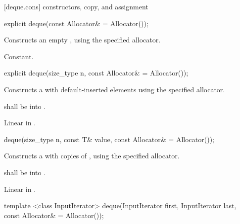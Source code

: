 [deque.cons]{ constructors, copy, and assignment}

%
%
\begin{itemdecl}
explicit deque(const Allocator& = Allocator());
\end{itemdecl}

\begin{itemdescr}
\pnum
\effects
Constructs an empty
,
using the specified allocator.

\pnum
\complexity
Constant.
\end{itemdescr}

%
%
\begin{itemdecl}
explicit deque(size_type n, const Allocator& = Allocator());
\end{itemdecl}

\begin{itemdescr}
\pnum
\effects Constructs a  with
 default-inserted elements using the specified allocator.

\pnum
\requires {} shall be  into .

\pnum
\complexity Linear in .
\end{itemdescr}

%
%
\begin{itemdecl}
deque(size_type n, const T& value,
      const Allocator& = Allocator());
\end{itemdecl}

\begin{itemdescr}
\pnum
\effects
Constructs a
with  copies of ,
using the specified allocator.

\pnum
\requires {} shall be  into .

\pnum
\complexity
Linear in .
\end{itemdescr}

%
%
\begin{itemdecl}
template <class InputIterator>
  deque(InputIterator first, InputIterator last,
        const Allocator& = Allocator());
\end{itemdecl}

